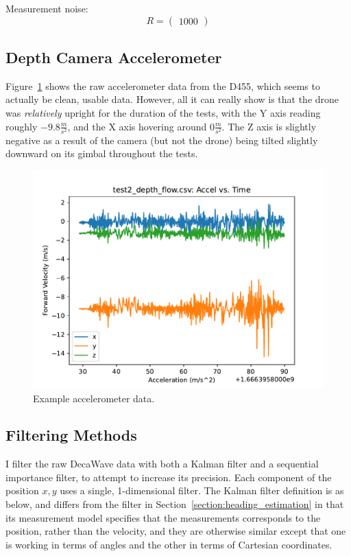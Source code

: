 Measurement noise:
$$
R =
\left(
\begin{matrix}
	1000
\end{matrix}
\right)
$$


\subsection{Depth Camera Accelerometer}

Figure~\ref{figure:test2_depth_accel} shows the raw accelerometer data from the D455,
which seems to actually be clean, usable data.
However, all it can really show is that the drone was \emph{relatively} upright for the duration of the tests,
with the Y axis reading roughly $-9.8 \frac{m}{s^2}$, and the X axis hovering around $0 \frac{m}{s^2}$.
The Z axis is slightly negative as a result of the camera (but not the drone) being tilted slightly
downward on its gimbal throughout the tests.

\begin{figure}
	\centering
	\includegraphics[width=\linewidth]{./images/test2_depth_flow_depth_accel.pdf}
	\caption{Example accelerometer data.}
	\label{figure:test2_depth_accel}
\end{figure}

\subsection{Filtering Methods}

I filter the raw DecaWave data with both a Kalman filter and a sequential importance filter,
to attempt to increase its precision.
Each component of the position $x,y$ uses a single, 1-dimensional filter.
The Kalman filter definition is as below, and differs from the filter in Section~\ref{section:heading_estimation} in that its measurement model specifies that the measurements corresponds to the position,
rather than the velocity, and they are otherwise similar except that one is working in terms of angles
and the other in terms of Cartesian coordinates.

